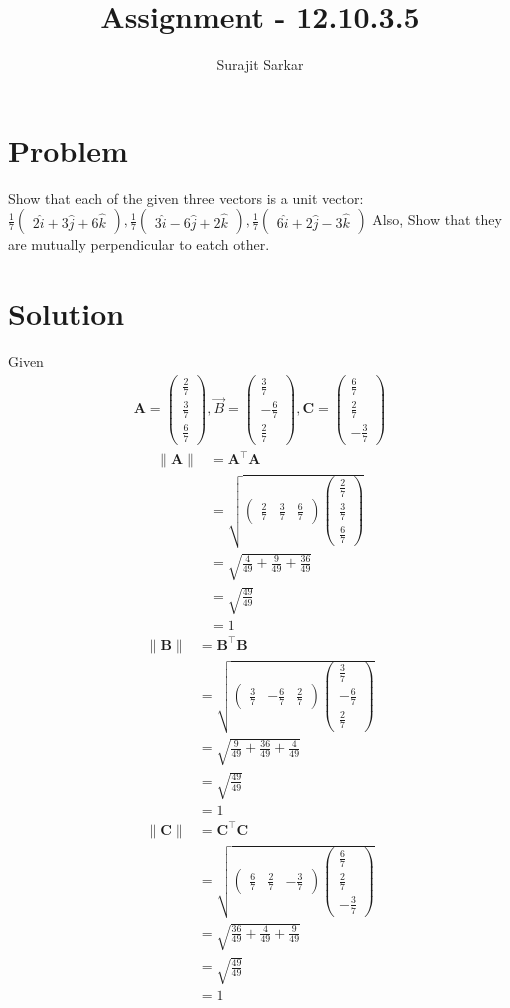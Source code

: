 \documentclass[journal,12pt,twocolumn]{IEEEtran}
\title{\mytitle}
\title{
Assignment - 12.10.3.5
}
\author{Surajit Sarkar}
\newcommand{\myvec}[1]{\ensuremath{\begin{pmatrix}#1\end{pmatrix}}}
\providecommand{\norm}[1]{\lVert#1\rVert}
\let\vec\mathbf
\begin{document}
\maketitle
\tableofcontents
\bigskip
\section{\textbf{Problem}}
Show that each of the given three vectors is a unit vector:$\frac{1}{7}\myvec{2\hat{i}+3\hat{j}+6\hat{k}},\frac{1}{7}\myvec{3\hat{i}-6\hat{j}+2\hat{k}},\frac{1}{7}\myvec{6\hat{i}+2\hat{j}-3\hat{k}}$
Also, Show that they are mutually perpendicular to eatch other.
\section{\textbf{Solution}}
Given
\begin{align}
\vec{A}=\myvec{\frac{2}{7}\\ \frac{3}{7}\\ \frac{6}{7}},\Vec{B}=\myvec{\frac{3}{7}\\ -\frac{6}{7}\\ \frac{2}{7}},\vec{C}=\myvec{\frac{6}{7}\\ \frac{2}{7}\\ -\frac{3}{7}}
\end{align}
\begin{align}
\norm{\vec{A}}&=\vec{A}^{\top}\vec{A}\\
&=\sqrt{\myvec{\frac{2}{7}&\frac{3}{7}&\frac{6}{7}}\myvec{\frac{2}{7}\\ \frac{3}{7}\\ \frac{6}{7}}}\\
&=\sqrt{\frac{4}{49}+\frac{9}{49}+\frac{36}{49}}\\
&=\sqrt{\frac{49}{49}}\\
&=1
\end{align}
\begin{align}
\norm{\vec{B}}&=\vec{B}^{\top}\vec{B}\\
&=\sqrt{\myvec{\frac{3}{7}&-\frac{6}{7}&\frac{2}{7}}\myvec{\frac{3}{7}\\ -\frac{6}{7}\\ \frac{2}{7}}}\\
&=\sqrt{\frac{9}{49}+\frac{36}{49}+\frac{4}{49}}\\
&=\sqrt{\frac{49}{49}}\\
&=1
\end{align}
\begin{align}
\norm{\vec{C}}&=\vec{C}^{\top}\vec{C}\\
&=\sqrt{\myvec{\frac{6}{7}&\frac{2}{7}&-\frac{3}{7}}\myvec{\frac{6}{7}\\ \frac{2}{7}\\ -\frac{3}{7}}}\\
&=\sqrt{\frac{36}{49}+\frac{4}{49}+\frac{9}{49}}\\
&=\sqrt{\frac{49}{49}}\\
&=1
\end{align}
\end{document}
